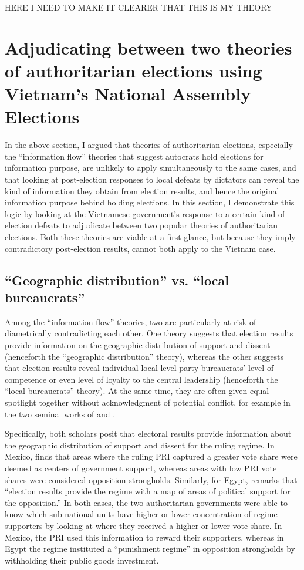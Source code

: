 \documentclass[12pt]{article}\usepackage[]{graphicx}\usepackage[]{color}
\newcommand{\1}{\mathbbm{1}}
\begin{document}
HERE I NEED TO MAKE IT CLEARER THAT THIS IS MY THEORY

\section{Adjudicating between two theories of authoritarian elections using Vietnam's National Assembly Elections}

In the above section, I argued that theories of authoritarian elections, especially the ``information flow'' theories that suggest autocrats hold elections for information purpose, are unlikely to apply simultaneously to the same cases, and that looking at post-election responses to local defeats by dictators can reveal the kind of information they obtain from election results, and hence the original information purpose behind holding elections. In this section, I demonstrate this logic by looking at the Vietnamese government's response to a certain kind of election defeats to adjudicate between two popular theories of authoritarian elections. Both these theories are viable at a first glance, but because they imply contradictory post-election results, cannot both apply to the Vietnam case.

\subsection{``Geographic distribution'' vs. ``local bureaucrats''}
Among the ``information flow'' theories, two are particularly at risk of diametrically contradicting each other. One theory suggests that election results provide information on the geographic distribution of support and dissent (henceforth the ``geographic distribution'' theory), whereas the other suggests that election results reveal individual local level party bureaucrats' level of competence or even level of loyalty to the central leadership (henceforth the ``local bureaucrats'' theory). At the same time, they are often given equal spotlight together without acknowledgment of potential conflict, for example in the two seminal works of \cite{Magaloni2006} and \cite{Blaydes2008}. 

Specifically, both scholars posit that electoral results provide information about the geographic distribution of support and dissent for the ruling regime. In Mexico, \cite{Magaloni2006} finds that areas where the ruling PRI captured a greater vote share were deemed as centers of government support, whereas areas with low PRI vote shares were considered opposition strongholds. Similarly, for Egypt, \cite{Blaydes2008} remarks that “election results provide the regime with a map of areas of political support for the opposition.” In both cases, the two authoritarian governments were able to know which sub-national units have higher or lower concentration of regime supporters by looking at where they received a higher or lower vote share. In Mexico, the PRI used this information to reward their supporters, whereas in Egypt the regime instituted a “punishment regime” in opposition strongholds by withholding their public goods investment.
\end{document}

